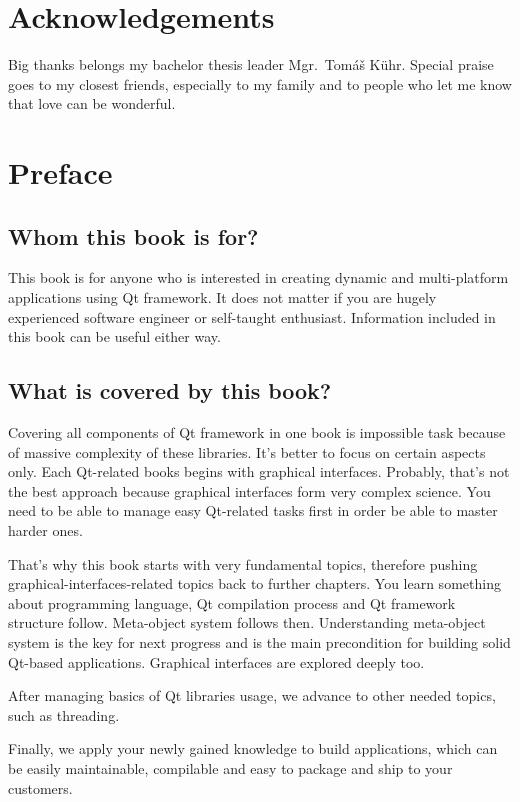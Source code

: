 \section*{Acknowledgements}
Big thanks belongs my bachelor thesis leader Mgr.~Tomáš Kühr. Special praise goes to my closest friends, especially to my family and to people who let me know that love can be wonderful.

\clearpage

\section*{Preface}

\subsection*{Whom this book is for?}
This book is for anyone who is interested in creating dynamic and multi-platform applications using Qt framework. It does not matter if you are hugely experienced software engineer or self-taught enthusiast. Information included in this book can be useful either way.

\subsection*{What is covered by this book?}
Covering all components of Qt framework in one book is impossible task because of massive complexity of these libraries. It's better to focus on certain aspects only. Each Qt-related books begins with graphical interfaces. Probably, that's not the best approach because graphical interfaces form very complex science. You need to be able to manage easy Qt-related tasks first in order be able to master harder ones.

That's why this book starts with very fundamental topics, therefore pushing graphical-interfaces-related topics back to further chapters. You learn something about \cpp programming language, Qt compilation process and Qt framework structure follow. Meta-object system follows then. Understanding meta-object system is the key for next progress and is the main precondition for building solid Qt-based applications. Graphical interfaces are explored deeply too.

After managing basics of Qt libraries usage, we advance to other needed topics, such as threading.

Finally, we apply your newly gained knowledge to build applications, which can be easily maintainable, compilable and easy to package and ship to your customers.


